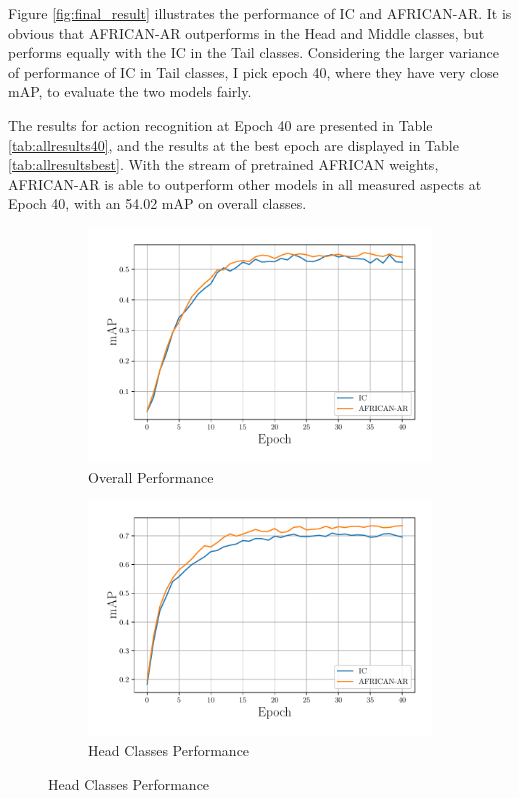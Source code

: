 Figure \ref{fig:final_result} illustrates the performance of IC and AFRICAN-AR. It is obvious that AFRICAN-AR outperforms in the Head and Middle classes, but performs equally with the IC in the Tail classes. Considering the larger variance of performance of IC in Tail classes, I pick epoch 40, where they have very close mAP, to evaluate the two models fairly.

The results for action recognition at Epoch 40 are presented in Table \ref{tab:allresults40}, and the results at the best epoch are displayed in Table \ref{tab:allresultsbest}. With the stream of pretrained AFRICAN weights, AFRICAN-AR is able to outperform other models in all measured aspects at Epoch 40, with an 54.02 mAP on overall classes.

\begin{figure}
    \centering
    \begin{adjustwidth}{-0.15\linewidth}{-0.07\linewidth}
    \begin{subfigure}[b]{0.65\textwidth}
        \includegraphics[width=\textwidth]{assets/charts/4_4_finalscore_0_overall}
        \caption{Overall Performance}
        \label{fig:subfig1}
    \end{subfigure}
    \begin{subfigure}[b]{0.65\textwidth}
        \includegraphics[width=\textwidth]{assets/charts/4_4_finalscore_1_head}
        \caption{Head Classes Performance}
        \label{fig:subfig2}
    \end{subfigure}


\end{adjustwidth}
\end{figure}
